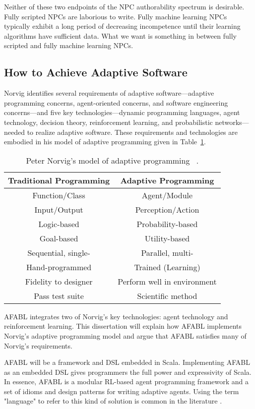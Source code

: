 Neither of these two endpoints of the NPC authorability spectrum is desirable.  Fully scripted NPCs are laborious to write.  Fully machine learning NPCs typically exhibit a long period of decreasing incompetence until their learning algorithms have sufficient data.  What we want is something in between fully scripted and fully machine learning NPCs.

\subsection{How to Achieve Adaptive Software}

Norvig identifies several requirements of adaptive
soft\-ware---adaptive programming concerns, agent-oriented concerns,
and software engineering concerns---and five key
technologies---dynamic programming languages, agent technology,
decision theory, reinforcement learning, and probabilistic
networks---needed to realize adaptive software.  These requirements
and technologies are embodied in his model of adaptive programming
given in Table~\ref{tab:adaptive-model}.

\begin{table}[h]
\begin{tabular}{|c|c|}\hline
Traditional Programming & Adaptive Programming \\ \hline
Function/Class & Agent/Module \\
Input/Output & Perception/Action \\
Logic-based & Probability-based \\
Goal-based & Utility-based \\
Sequential, single- & Parallel, multi- \\
Hand-programmed & Trained (Learning) \\
Fidelity to designer & Perform well in environment \\
Pass test suite & Scientific method\\ \hline
\end{tabular}
\caption{Peter Norvig's model of adaptive programming
  ~\cite{norvig1998decision}.}
\label{tab:adaptive-model}
\end{table}

AFABL integrates two of Norvig's key technologies: agent technology and reinforcement learning.  This dissertation will explain how AFABL implements Norvig's adaptive programming model and argue that AFABL satisfies many of Norvig's requirements.

AFABL will be a framework and DSL embedded in Scala.  Implementing AFABL as an embedded DSL gives programmers the full power and expressivity of Scala.  In essence, AFABL is a modular RL-based agent programming framework and a set of idioms and design patterns for writing adaptive agents.  Using the term "language" to refer to this kind of solution is common in the literature \cite{andre2002state}.

